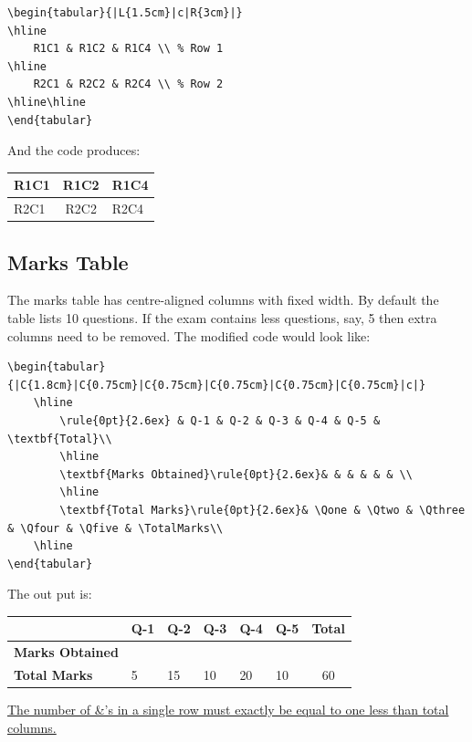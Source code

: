 \documentclass[12pt,a4paper]{article}
\newcommand\TotalMarks{60}
\def\Qone{5}
\def\Qtwo{15}
\def\Qthree{10}
\def\Qfour{20}
\def\Qfive{10}
\begin{document}
\begin{lstlisting}
\begin{tabular}{|L{1.5cm}|c|R{3cm}|}
\hline
	R1C1 & R1C2 & R1C4 \\ % Row 1
\hline
	R2C1 & R2C2 & R2C4 \\ % Row 2
\hline\hline
\end{tabular}
\end{lstlisting}
And the code produces:
\begin{tabular}{|L{1.5cm}|c|R{3cm}|}
\hline
	R1C1 & R1C2 & R1C4 \\
\hline
	R2C1 & R2C2 & R2C4 \\
\hline\hline
\end{tabular}
\subsection{Marks Table}
The marks table has centre-aligned columns with fixed width. By default the table lists 10 questions. If the exam contains less questions, say, 5 then extra columns need to be removed. The modified code would look like:\newpage
\begin{lstlisting}
\begin{tabular}{|C{1.8cm}|C{0.75cm}|C{0.75cm}|C{0.75cm}|C{0.75cm}|C{0.75cm}|c|}
	\hline
		\rule{0pt}{2.6ex} & Q-1 & Q-2 & Q-3 & Q-4 & Q-5 & \textbf{Total}\\
		\hline
		\textbf{Marks Obtained}\rule{0pt}{2.6ex}& & & & & & \\
		\hline
		\textbf{Total Marks}\rule{0pt}{2.6ex}& \Qone & \Qtwo & \Qthree & \Qfour & \Qfive & \TotalMarks\\
	\hline
\end{tabular}
\end{lstlisting}
The out put is:
\begin{table}[H]
	{\footnotesize \begin{tabular}{|C{1.8cm}|C{0.75cm}|C{0.75cm}|C{0.75cm}|C{0.75cm}|C{0.75cm}|c|}
	\hline
		\rule{0pt}{2.6ex} & Q-1 & Q-2 & Q-3 & Q-4 & Q-5 & \textbf{Total}\\
		\hline
		\textbf{Marks Obtained}\rule{0pt}{2.6ex}& & & & & & \\
		\hline
		\textbf{Total Marks}\rule{0pt}{2.6ex}& \Qone & \Qtwo & \Qthree & \Qfour & \Qfive & \TotalMarks\\
	\hline
\end{tabular}}
\end{table}
\underline{The number of \&'s in a single row must exactly be equal to one less than total columns.}
\end{document}
